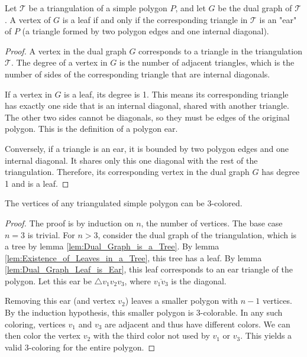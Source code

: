 \begin{lemma}
    \label{lem:Dual_Graph_Leaf_is_Ear}
    Let $\mathcal{T}$ be a triangulation of a simple polygon $P$, and let $G$ be the dual graph of $\mathcal{T}$. A vertex of $G$ is a leaf if and only if the corresponding triangle in $\mathcal{T}$ is an "ear" of $P$ (a triangle formed by two polygon edges and one internal diagonal).
\end{lemma}

\begin{proof}
    A vertex in the dual graph $G$ corresponds to a triangle in the triangulation $\mathcal{T}$. The degree of a vertex in $G$ is the number of adjacent triangles, which is the number of sides of the corresponding triangle that are internal diagonals.
    
    If a vertex in $G$ is a leaf, its degree is 1. This means its corresponding triangle has exactly one side that is an internal diagonal, shared with another triangle. The other two sides cannot be diagonals, so they must be edges of the original polygon. This is the definition of a polygon ear.
    
    Conversely, if a triangle is an ear, it is bounded by two polygon edges and one internal diagonal. It shares only this one diagonal with the rest of the triangulation. Therefore, its corresponding vertex in the dual graph $G$ has degree 1 and is a leaf.
\end{proof}

\begin{lemma}
    \label{lem:3-Colorability_of_a_Triangulated_Polygon}
    The vertices of any triangulated simple polygon can be 3-colored.
\end{lemma}

\begin{proof}
    The proof is by induction on $n$, the number of vertices. The base case $n=3$ is trivial. For $n>3$, consider the dual graph of the triangulation, which is a tree by lemma \ref{lem:Dual_Graph_is_a_Tree}. By lemma \ref{lem:Existence_of_Leaves_in_a_Tree}, this tree has a leaf. By lemma \ref{lem:Dual_Graph_Leaf_is_Ear}, this leaf corresponds to an ear triangle of the polygon. Let this ear be $\triangle v_1v_2v_3$, where $\overline{v_1v_3}$ is the diagonal.
    
    Removing this ear (and vertex $v_2$) leaves a smaller polygon with $n-1$ vertices. By the induction hypothesis, this smaller polygon is 3-colorable. In any such coloring, vertices $v_1$ and $v_3$ are adjacent and thus have different colors. We can then color the vertex $v_2$ with the third color not used by $v_1$ or $v_3$. This yields a valid 3-coloring for the entire polygon.
\end{proof}

